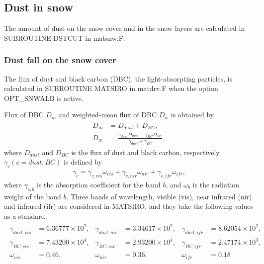 \subsection{Dust in snow}\label{dust-in-snow}

The amount of dust on the snow cover and in the snow layers are calculated in SUBROUTINE DSTCUT in matsnw.F.

\subsubsection{Dust fall on the snow cover}\label{dust-fall-on-the-snow-cover}

The flux of dust and black carbon (DBC), the light-absorpting particles, is calculated in SUBROUTINE MATSIRO in matdrv.F when the option OPT\_SNWALB is active.

Flux of DBC \(D_m\) and weighted-mean flux of DBC \(D_w\) is obtained by \begin{eqnarray}
\begin{aligned}
D_m &= D_{dust} + D_{BC}, \\
D_w &= \frac{\gamma_{dust} D_{dust} + \gamma_{BC} D_{BC}}{\gamma_{dust} + \gamma_{BC}},
\end{aligned} \label{8-45}
\end{eqnarray} where \(D_{dust}\) and \(D_{BC}\) is the flux of dust and black carbon, respectively. \(\gamma_{c} (c = dust, BC)\) is defined by \begin{eqnarray}
\gamma_{c} = \gamma_{c,vis} \omega_{vis} + \gamma_{c,nir} \omega_{nir} + \gamma_{c,ifr} \omega_{ifr}, \label{8-46}
\end{eqnarray} where \(\gamma_{c,b}\) is the absorption coefficient for the band \(b\), and \(\omega_b\) is the radiation weight of the band \(b\). Three bands of wavelength, visible (vis), near infrared (nir)
and infrared (ifr) are considered in MATSIRO, and they take the following values as a standard. \begin{eqnarray}
\begin{aligned}
\gamma_{dust,vis} &= 6.36777 \times 10^2, &
\gamma_{dust,nir} &= 3.34617 \times 10^2, &
\gamma_{dust,ifr} &= 8.62054 \times 10^2, \\
\gamma_{BC,vis}   &= 7.43200 \times 10^4, &
\gamma_{BC,nir}   &= 2.93200 \times 10^4, &
\gamma_{BC,ifr}   &= 2.47174 \times 10^3, \\
\omega_{vis} &= 0.46, &\omega_{nir} &= 0.36, &\omega_{ifr} &= 0.18
\end{aligned} \label{8-47}
\end{eqnarray}

